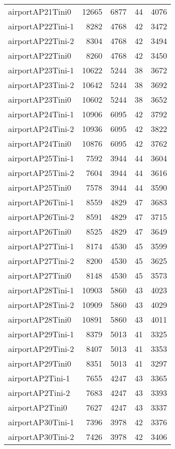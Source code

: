 \begin{longtable}{lrrrr}
airportAP21Tini0 & 12665 & 6877 & 44 & 4076 \\
airportAP22Tini-1 & 8282 & 4768 & 42 & 3472 \\
airportAP22Tini-2 & 8304 & 4768 & 42 & 3494 \\
airportAP22Tini0 & 8260 & 4768 & 42 & 3450 \\
airportAP23Tini-1 & 10622 & 5244 & 38 & 3672 \\
airportAP23Tini-2 & 10642 & 5244 & 38 & 3692 \\
airportAP23Tini0 & 10602 & 5244 & 38 & 3652 \\
airportAP24Tini-1 & 10906 & 6095 & 42 & 3792 \\
airportAP24Tini-2 & 10936 & 6095 & 42 & 3822 \\
airportAP24Tini0 & 10876 & 6095 & 42 & 3762 \\
airportAP25Tini-1 & 7592 & 3944 & 44 & 3604 \\
airportAP25Tini-2 & 7604 & 3944 & 44 & 3616 \\
airportAP25Tini0 & 7578 & 3944 & 44 & 3590 \\
airportAP26Tini-1 & 8559 & 4829 & 47 & 3683 \\
airportAP26Tini-2 & 8591 & 4829 & 47 & 3715 \\
airportAP26Tini0 & 8525 & 4829 & 47 & 3649 \\
airportAP27Tini-1 & 8174 & 4530 & 45 & 3599 \\
airportAP27Tini-2 & 8200 & 4530 & 45 & 3625 \\
airportAP27Tini0 & 8148 & 4530 & 45 & 3573 \\
airportAP28Tini-1 & 10903 & 5860 & 43 & 4023 \\
airportAP28Tini-2 & 10909 & 5860 & 43 & 4029 \\
airportAP28Tini0 & 10891 & 5860 & 43 & 4011 \\
airportAP29Tini-1 & 8379 & 5013 & 41 & 3325 \\
airportAP29Tini-2 & 8407 & 5013 & 41 & 3353 \\
airportAP29Tini0 & 8351 & 5013 & 41 & 3297 \\
airportAP2Tini-1 & 7655 & 4247 & 43 & 3365 \\
airportAP2Tini-2 & 7683 & 4247 & 43 & 3393 \\
airportAP2Tini0 & 7627 & 4247 & 43 & 3337 \\
airportAP30Tini-1 & 7396 & 3978 & 42 & 3376 \\
airportAP30Tini-2 & 7426 & 3978 & 42 & 3406 \\

\end{longtable}
